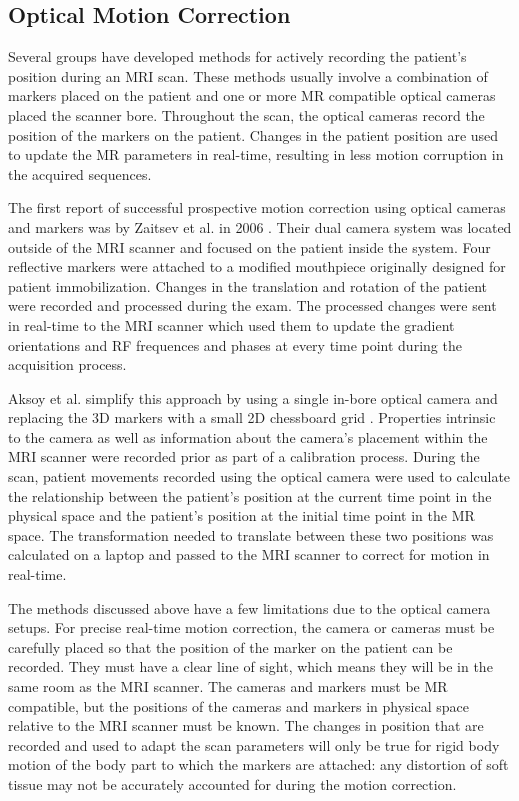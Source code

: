 \subsection{Optical Motion Correction}

Several groups have developed methods for actively recording the patient's position during an MRI scan. These methods usually involve a combination of markers placed on the patient and one or more MR compatible optical cameras placed the scanner bore. Throughout the scan, the optical cameras record the position of the markers on the patient. Changes in the patient position are used to update the MR parameters in real-time, resulting in less motion corruption in the acquired sequences.

The first report of successful prospective motion correction using optical cameras and markers was by Zaitsev et al. in 2006 \cite{Zaitsev2006}. Their dual camera system was located outside of the MRI scanner and focused on the patient inside the system. Four reflective markers were attached to a modified mouthpiece originally designed for patient immobilization. Changes in the translation and rotation of the patient were recorded and processed during the exam. The processed changes were sent in real-time to the MRI scanner which used them to update the gradient orientations and RF frequences and phases at every time point during the acquisition process.

Aksoy et al. simplify this approach by using a single in-bore optical camera and replacing the 3D markers with a small 2D chessboard grid \cite{Aksoy2008}. Properties intrinsic to the camera as well as information about the camera's placement within the MRI scanner were recorded prior as part of a calibration process. During the scan, patient movements recorded using the optical camera were used to calculate the relationship between the patient's position at the current time point in the physical space and the patient's position at the initial time point in the MR space. The transformation needed to translate between these two positions was calculated on a laptop and passed to the MRI scanner to correct for motion in real-time.


The methods discussed above have a few limitations due to the optical camera setups. For precise real-time motion correction, the camera or cameras must be carefully placed so that the position of the marker on the patient can be recorded. They must have a clear line of sight, which means they will be in the same room as the MRI scanner. The cameras and markers must be MR compatible, but the positions of the cameras and markers in physical space relative to the MRI scanner must be known. The changes in position that are recorded and used to adapt the scan parameters will only be true for rigid body motion of the body part to which the markers are attached: any distortion of soft tissue may not be accurately accounted for during the motion correction. 

